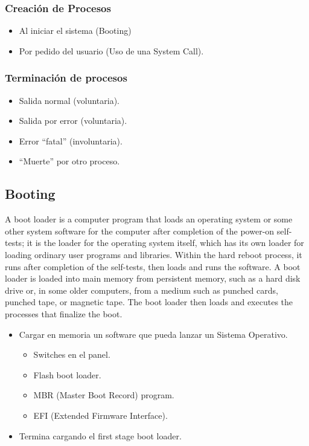 \documentclass[a4paper, twoside]{article}
\begin{document}
\subsubsection{Creación de Procesos}

\begin{itemize}
  \item Al iniciar el sistema (Booting)
  \item Por pedido del usuario (Uso de una System Call).
\end{itemize}

\subsubsection{Terminación de procesos}

\begin{itemize}
  \item Salida normal (voluntaria).
  \item Salida por error (voluntaria).
  \item Error ``fatal'' (involuntaria).
  \item ``Muerte'' por otro proceso.
\end{itemize}

\subsection{Booting}
A boot loader is a computer program that loads an operating system or some
other system software for the computer after completion of the power-on
self-tests; it is the loader for the operating system itself, which has its own
loader for loading ordinary user programs and libraries.
Within the hard reboot process, it runs after completion of the self-tests,
then loads and runs the software.
A boot loader is loaded into main memory from persistent memory, such as a hard
disk drive or, in some older computers, from a medium such as punched cards,
punched tape, or magnetic tape.
The boot loader then loads and executes the processes that finalize the boot.

\begin{itemize}
  \item Cargar en memoria un software que pueda lanzar un Sistema Operativo.
  \begin{itemize}
    \item Switches en el panel.
    \item Flash boot loader.
    \item MBR (Master Boot Record) program.
    \item EFI (Extended Firmware Interface).
  \end{itemize}
  \item Termina cargando el first stage boot loader.
\end{itemize}
\end{document}
